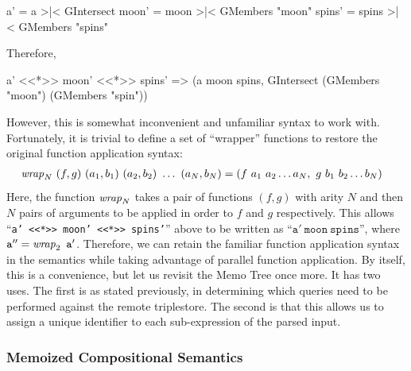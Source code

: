 \documentclass[../main.tex]{subfiles}
\begin{document}
\begin{refsection}
\begin{code}
    a' = a >|< GIntersect
    moon' = moon >|< GMembers "moon"
    spins' = spins >|< GMembers "spins"
\end{code}
Therefore,
\begin{code}
    a' <<*>> moon' <<*>> spins'
    => (a moon spins, GIntersect (GMembers "moon") (GMembers "spin"))
\end{code}
However, this is somewhat inconvenient and unfamiliar syntax to work with. Fortunately, it is trivial to define a set of ``wrapper'' functions to restore the original function application syntax:
\begin{equation*}
	\begin{split}
		&\operatorname{\mathit{wrap}}_N\ (f, g)\ (a_1, b_1)\ (a_2,b_2)\ \ldots\ (a_N, b_N) = (f\ a_1\ a_2 \ldots a_N,\ g\ b_1\ b_2 \ldots b_N)
	\end{split}
\end{equation*}
Here, the function $\operatorname{\mathit{wrap}}_N$ takes a pair of functions $(f, g)$ with arity $N$ and then $N$ pairs of arguments to be applied in order to $f$ and $g$ respectively.  This allows ``\texttt{a' <<*>> moon' <<*>> spins'}'' above to be written as ``$\mathtt{a'\ moon\ spins}$'', where $\mathtt{a''} = \operatorname{\mathit{wrap}}_2\ \mathtt{a'}$.
Therefore, we can retain the familiar function application syntax in the semantics while taking advantage of parallel function application. By itself, this is a convenience, but let us revisit the Memo Tree once more. It has two uses. The first is as stated previously, in determining which queries need to be performed against the remote triplestore. The second is that this allows us to assign a unique identifier to each sub-expression of the parsed input.

\subsubsection{Memoized Compositional Semantics}
\label{webist2019journal:memoization}


\end{refsection}
\end{document}
